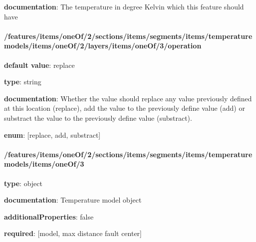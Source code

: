 \begin{itemized}
\item {\bf documentation}: The temperature in degree Kelvin which this feature should have
\end{itemized}\paragraph{/features/items/oneOf/2/sections/items/segments/items/temperature models/items/oneOf/2/layers/items/oneOf/3/operation} \begin{itemized}
\item {\bf default value}: replace
\item {\bf type}: string
\item {\bf documentation}: Whether the value should replace any value previously defined at this location (replace), add the value to the previously define value (add) or substract the value to the previously define value (substract).
\item {\bf enum}: [replace, add, substract]\end{itemized}\paragraph{/features/items/oneOf/2/sections/items/segments/items/temperature models/items/oneOf/3} \begin{itemized}
\item {\bf type}: object
\item {\bf documentation}: Temperature model object
\item {\bf additionalProperties}: false
\item {\bf required}: [model, max distance fault center]\end{itemized}
